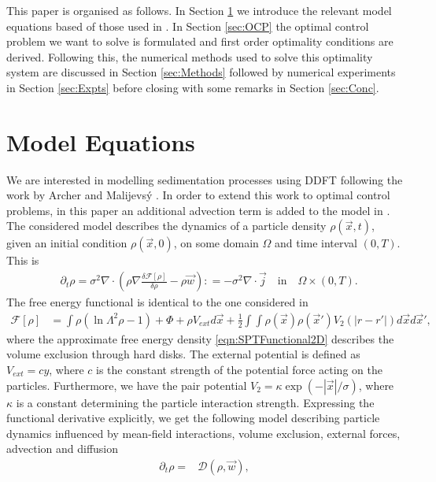 \documentclass[final]{siamltex}
\newcommand{\w}{\vec{w}}
\newcommand{\x}{\vec{x}}
\newcommand{\F}{\mathcal{F}}
\begin{document}
This paper is organised as follows. In Section \ref{sec:FWModel} we introduce the relevant model equations based of those used in \cite{ArcherSed1}. In Section \ref{sec:OCP} the optimal control problem we want to solve is formulated and first order optimality conditions are derived. Following this, the numerical methods used to solve this optimality system are discussed in Section \ref{sec:Methods} followed by numerical experiments in Section \ref{sec:Expts} before closing with some remarks in Section \ref{sec:Conc}.

\section{Model Equations}\label{sec:FWModel}
We are interested in modelling sedimentation processes using DDFT following the work by Archer and Malijevs\'y \cite{ArcherSed1}. 
In order to extend this work to optimal control problems, in this paper an additional advection term is added to the model in \cite{ArcherSed1}. The considered model describes the dynamics of a particle density $\rho(\x, t)$, given an initial condition $\rho(\x,0)$, on some domain $\Omega$ and time interval $(0,T)$. This is
\begin{align}\label{Eq1}
	&\partial_t \rho = \sigma^2\nabla \cdot \left(  \rho \nabla \frac{\delta \F[\rho]}{\delta \rho} - \rho \w  \right): = - \sigma^2\nabla \cdot \vec j \quad \text{in} \quad \Omega \times (0,T).
\end{align}
 The free energy functional is identical to the one considered in \cite{ArcherSed1}
\begin{align*}
	\F[\rho] &= \int  \rho (\ln \Lambda^2 \rho - 1)  + \Phi + \rho V_{ext}  d \x + \frac{1}{2}\int \int \rho(\x) \rho(\x') V_2(|r - r'|) d\x d\x',
\end{align*}
where the approximate free energy density \eqref{eqn:SPTFunctional2D} describes the volume exclusion through hard disks. The external potential is defined as $V_{ext} = c y$, where $c$ is the constant strength of the potential force acting on the particles. Furthermore, we have the pair potential $V_2 = \kappa \exp(-|\x|/\sigma)$, where $\kappa$ is a constant determining the particle interaction strength. Expressing the functional derivative explicitly, we get the following model describing particle dynamics influenced by mean-field interactions, volume exclusion, external forces, advection and diffusion
\begin{align} \label{eq:SedFWModel}
	\partial_t \rho =&  \mathcal{D}(\rho,\w),
\end{align}
\end{document}
